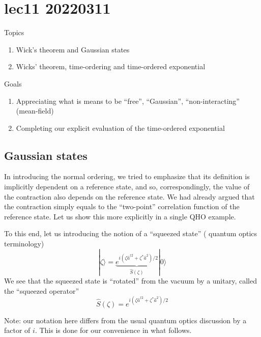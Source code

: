 \chapter{lec11 20220311}

Topics

\begin{enumerate}
    \item Wick's theorem and Gaussian states
    \item Wicks' theorem, time-ordering and time-ordered exponential
\end{enumerate}

Goals

\begin{enumerate}
    \item Appreciating what is means to be ``free'', ``Gaussian'', ``non-interacting'' (mean-field)
    \item Completing our explicit evaluation of the time-ordered exponential
\end{enumerate}

\section{Gaussian states}

In introducing the normal ordering, we tried to emphasize that its definition is implicitly dependent on a reference state, and so, correspondingly, the value of the contraction also depends on the reference state. We had already argued that the contraction simply equals to the ``two-point'' correlation function of the reference state. Let us show this more explicitly in a single QHO example.

To this end, let us introducing the notion of a ``squeezed state'' ( quantum optics terminology)
\[ |\zeta \rangle =\underset{\hat{S}\left( \zeta \right)}{\underbrace{e^{i\left( \zeta \hat{a}^{\dagger 2}+\zeta ^*\hat{a}^2 \right) /2}}}|0\rangle \]
We see that the squeezed state is ``rotated'' from the vacuum by a unitary, called the ``squeezed operator''
\[ \hat{S}\left( \zeta \right) =e^{i\left( \zeta \hat{a}^{\dagger 2}+\zeta ^*\hat{a}^2 \right) /2}\]

Note: our notation here differs from the usual quantum optics discussion by a factor of $i$. This is done for our convenience in what follows.

